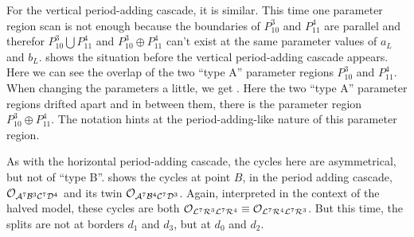 For the vertical period-adding cascade, it is similar.
This time one parameter region scan is not enough because the boundaries of $P_{10}^3$ and $P_{11}^4$ are parallel and therefor $P_{10}^3 \bigcup P_{11}^4$ and $P_{10}^3 \oplus P_{11}^4$ can't exist at the same parameter values of $a_L$ and $b_L$.
 shows the situation before the vertical period-adding cascade appears.
Here we can see the overlap of the two ``type A'' parameter regions $P_{10}^3$ and $P_{11}^4$.
When changing the parameters a little, we get .
Here the two ``type A'' parameter regions drifted apart and in between them, there is the parameter region $P_{10}^3 \oplus P_{11}^4$.
The notation hints at the period-adding-like nature of this parameter region.

As with the horizontal period-adding cascade, the cycles here are asymmetrical, but not of ``type B''.
 shows the cycles at point $B$, in the period adding cascade, $\mathcal{O}_{\mathcal{A}^7\mathcal{B}^3\mathcal{C}^7\mathcal{D}^4}$ and its twin $\mathcal{O}_{\mathcal{A}^7\mathcal{B}^4\mathcal{C}^7\mathcal{D}^3}$.
Again, interpreted in the context of the halved model, these cycles are both $\mathcal{O}_{\mathcal{L}^7\mathcal{R}^3\mathcal{L}^7\mathcal{R}^4} \equiv \mathcal{O}_{\mathcal{L}^7\mathcal{R}^4\mathcal{L}^7\mathcal{R}^3}$.
But this time, the splits are not at borders $d_1$ and $d_3$, but at $d_0$ and $d_2$.

